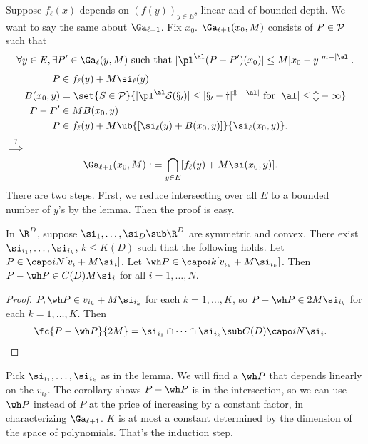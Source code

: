 Suppose 
$f_\ell(x)$ depends on $(f(y))_{y\in E}$, linear and of bounded depth. We want to say the same about $\Ga_{\ell+1}$. Fix $x_0$. $\Ga_{\ell+1}(x_0,M)$ consists of $P\in \cal P$ such that 
\begin{align}
\forall y\in E, \exists P'\in \Ga_\ell(y,M) \text{ such that } |\pl^\al(P-P')(x_0)|\le M|x_0-y|^{m-|\al|}.
\end{align}
\begin{align}
P&\in f_\ell(y) + M\si_\ell(y)\\
B(x_0,y) &= \set{S\in \cal P}{|\pl^\al S(x_0)|\le |x_0-y|^{m-|\al|}\text{ for }|\al|\le m-1}\\
P-P'&\in MB(x_0,y)\\
P&\in f_\ell(y) + M\ub{[\si_\ell(y) + B(x_0,y)]}{\si_\ell(x_0,y)}.
\end{align}
$\stackrel{?}{\implies}$
\begin{align}
\Ga_{\ell+1}(x_0,M) :&= \bigcap_{y\in E}
[f_\ell(y) + M\si(x_0,y)].
\end{align}
There are two steps. First, we reduce intersecting over all $E$ to a bounded number of $y$'s by the lemma. Then the proof is easy. 

\begin{cor}
In $\R^D$, suppose $\si_1,\ldots, \si_D\sub \R^D$ are symmetric and convex. 
There exist $\si_{i_1},\ldots, \si_{i_k}$, $k\le K(D)$ such that the following holds. Let $P\in \capo iN [v_i+M\si_i]$. Let $\wh P\in \capo ik [v_{i_k}+M\si_{i_k}]$. 
Then 
$P-\wh P\in C(D)M\si_i$ for all $i=1,\ldots, N$.
\end{cor}
\begin{proof}
$P,\wh P\in v_{i_k}+M\si_{i_k}$ for each $k=1,\ldots, K$, so $P-\wh P\in 2M\si_{i_k}$ for each $k=1,\ldots, K$. Then 
\begin{align}
\fc{P-\wh P}{2M}&= \si_{i_1}\cap \cdots \cap \si_{i_k} \sub C(D)\capo iN \si_i.
\end{align}
\end{proof}
Pick $\si_{i_1},\ldots, \si_{i_k}$ as in the lemma. We will find a $\wh P$ that depends linearly on the $v_{i_k}$.  %
The corollary shows $P-\wh P$ is in the intersection, so we can use $\wh P$ instead of $P$ at the price of increasing by a constant factor, in characterizing $\Ga_{\ell+1}$. $K$ is at most a constant determined by the dimension of the space of polynomials. That's the induction step.

